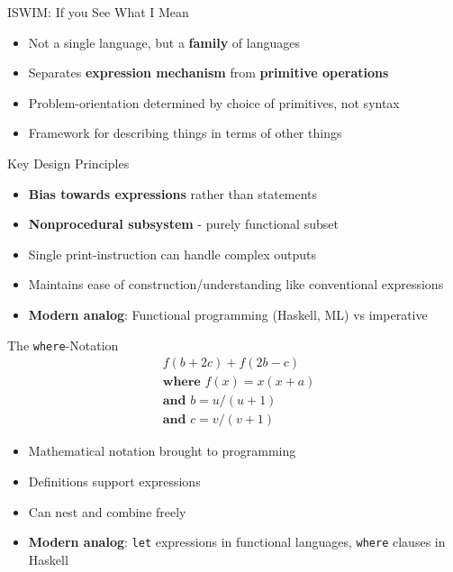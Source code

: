 \documentclass[10pt]{beamer}
\begin{document}
\begin{frame}{ISWIM: If you See What I Mean}
\begin{itemize}
\item Not a single language, but a \textbf{family} of languages
\item Separates \textbf{expression mechanism} from \textbf{primitive operations}
\item Problem-orientation determined by choice of primitives, not syntax
\item Framework for describing things in terms of other things
\end{itemize}
\end{frame}

\begin{frame}{Key Design Principles}
\begin{itemize}
\item \textbf{Bias towards expressions} rather than statements
\item \textbf{Nonprocedural subsystem} - purely functional subset
\item Single print-instruction can handle complex outputs
\item Maintains ease of construction/understanding like conventional expressions
\item \textbf{Modern analog}: Functional programming (Haskell, ML) vs imperative
\end{itemize}
\end{frame}

\begin{frame}{The \texttt{where}-Notation}
\begin{align*}
& f(b+2c) + f(2b-c) \\
& \textbf{where } f(x) = x(x+a) \\
& \textbf{and } b = u/(u+1) \\
& \textbf{and } c = v/(v+1)
\end{align*}
\begin{itemize}
\item Mathematical notation brought to programming
\item Definitions support expressions
\item Can nest and combine freely
\item \textbf{Modern analog}: \texttt{let} expressions in functional languages, \texttt{where} clauses in Haskell
\end{itemize}
\end{frame}
\end{document}
